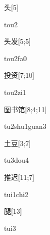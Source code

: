 \begin{verbete}[tou2]{头}[5]
\begin{pronuncia}{tou2}
\end{pronuncia}
\end{verbete}

\begin{verbete}[tou2fa0]{头发}[5;5]
\begin{pronuncia}{tou2fa0}
\end{pronuncia}
\end{verbete}

\begin{verbete}[tou2zi1]{投资}[7;10]
\begin{pronuncia}{tou2zi1}
\end{pronuncia}
\end{verbete}

\begin{verbete}{图书馆}[8;4;11]
\begin{pronuncia}{tu2shu1guan3}
\end{pronuncia}
\end{verbete}

\begin{verbete}[tu3dou4]{土豆}[3;7]
\begin{pronuncia}{tu3dou4}
\end{pronuncia}
\end{verbete}

\begin{verbete}{推迟}[11;7]
\begin{pronuncia}{tui1chi2}
\end{pronuncia}
\end{verbete}

\begin{verbete}[tui3]{腿}[13]
\begin{pronuncia}{tui3}
\end{pronuncia}
\end{verbete}

